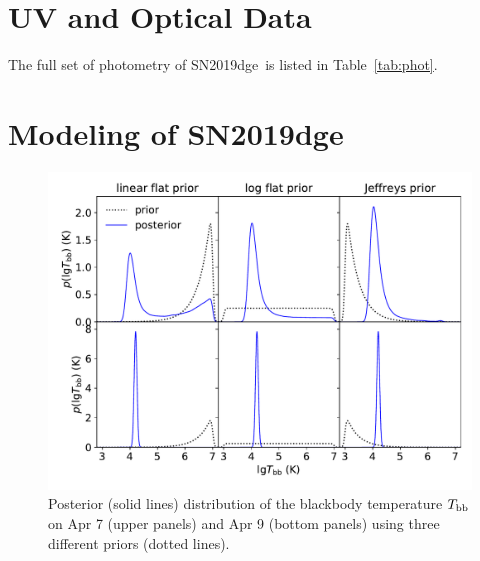 \documentclass[twocolumn]{aastex63}
\newcommand{\name}{SN2019dge}
\begin{document}

\appendix

\section{UV and Optical Data} \label{sec:appphot_data}

The full set of photometry of \name\ is listed in Table~\ref{tab:phot}. 


\section{Modeling of \name}

\begin{figure}[htbp!]
	\centering
	\includegraphics[width=\columnwidth]{figures/bbprior.pdf}
	\caption{Posterior (solid lines) distribution of the blackbody temperature 
		$T_{\rm bb}$ on Apr 7 (upper panels) and Apr 9 (bottom panels) using three different priors 
		(dotted 
		lines).	\label{fig:bbprior}}
\end{figure}
\end{document}
